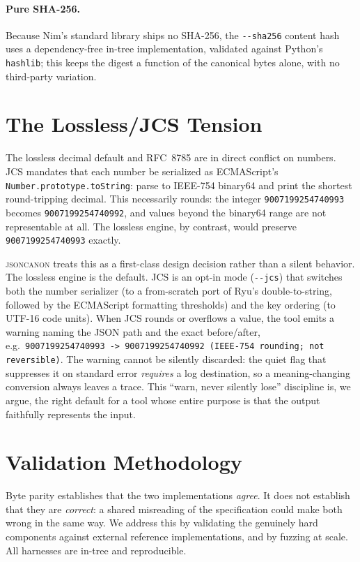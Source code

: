 \documentclass[11pt]{article}
\newcommand{\tool}{\textsc{jsoncanon}}
\newcommand{\code}[1]{\texttt{#1}}
\begin{document}
\paragraph{Pure SHA-256.}
Because Nim's standard library ships no SHA-256, the \code{-{}-sha256} content
hash uses a dependency-free in-tree implementation, validated against Python's
\code{hashlib}; this keeps the digest a function of the canonical bytes alone,
with no third-party variation.

\section{The Lossless/JCS Tension}\label{sec:jcs}

The lossless decimal default and RFC~8785 are in direct conflict on numbers.
JCS mandates that each number be serialized as ECMAScript's
\code{Number.prototype.toString}: parse to IEEE-754 binary64 and print the
shortest round-tripping decimal. This necessarily rounds: the integer
\code{9007199254740993} becomes \code{9007199254740992}, and values beyond the
binary64 range are not representable at all. The lossless engine, by contrast,
would preserve \code{9007199254740993} exactly.

\tool{} treats this as a first-class design decision rather than a silent
behavior. The lossless engine is the default. JCS is an opt-in mode
(\code{-{}-jcs}) that switches both the number serializer (to a from-scratch
port of Ryu's double-to-string, followed by the ECMAScript formatting
thresholds) and the key ordering (to UTF-16 code units). When JCS rounds or
overflows a value, the tool emits a warning naming the JSON path and the exact
before/after, e.g.\ \code{9007199254740993 -> 9007199254740992 (IEEE-754
rounding; not reversible)}. The warning cannot be silently discarded: the
quiet flag that suppresses it on standard error \emph{requires} a log
destination, so a meaning-changing conversion always leaves a trace. This
``warn, never silently lose'' discipline is, we argue, the right default for a
tool whose entire purpose is that the output faithfully represents the input.

\section{Validation Methodology}\label{sec:validation}

Byte parity establishes that the two implementations \emph{agree}. It does not
establish that they are \emph{correct}: a shared misreading of the specification
could make both wrong in the same way. We address this by validating the
genuinely hard components against external reference implementations, and by
fuzzing at scale. All harnesses are in-tree and reproducible.
\end{document}
